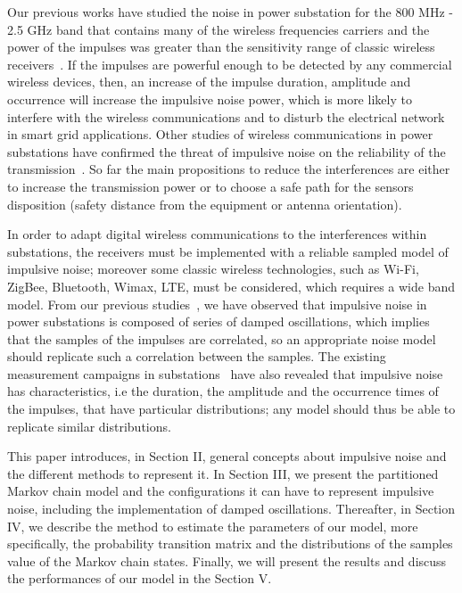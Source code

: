 \documentclass[journal]{IEEEtran}
\begin{document}
Our previous works have studied the noise in power substation for the 800 MHz - 2.5 GHz band that contains many of the wireless frequencies carriers and the power of the impulses was greater than the sensitivity range of classic wireless receivers~\cite{taiwan,cigre}. If the impulses are powerful enough to be detected by any commercial wireless devices, then, an increase of the impulse duration, amplitude and occurrence will increase the impulsive noise power, which is more likely to interfere with the wireless communications and to disturb the electrical network in smart grid applications. Other studies of wireless communications in power substations have confirmed the threat of impulsive noise on the reliability of the transmission~\cite{WC1, WC2, WC3, WC4}. So far the main propositions to reduce the interferences are either to increase the transmission power or to choose a safe path for the sensors disposition (safety distance from the equipment or antenna orientation).\

In order to adapt digital wireless communications to the interferences within substations, the receivers must be implemented with a reliable sampled model of impulsive noise; moreover some classic wireless technologies, such as Wi-Fi, ZigBee, Bluetooth, Wimax, LTE, must be considered, which requires a wide band model. From our previous studies~\cite{cigre,taiwan}, we have observed that impulsive noise in power substations is composed of series of damped oscillations, which implies that the samples of the impulses are correlated, so an appropriate noise model should replicate such a correlation between the samples. The existing measurement campaigns in substations~\cite{cigre} have also revealed that impulsive noise has characteristics, i.e the duration, the amplitude and the occurrence times of the impulses, that have particular distributions; any model should thus be able to replicate similar distributions.\

This paper introduces, in Section II, general concepts about impulsive noise and the different methods to represent it. In Section III, we present the partitioned Markov chain model and the configurations it can have to represent impulsive noise, including the implementation of damped oscillations. Thereafter, in Section IV, we describe the method to estimate the parameters of our model, more specifically, the probability transition matrix and the distributions of the samples value of the Markov chain states. Finally, we will present the results and discuss the performances of our model in the Section V.
\end{document}
